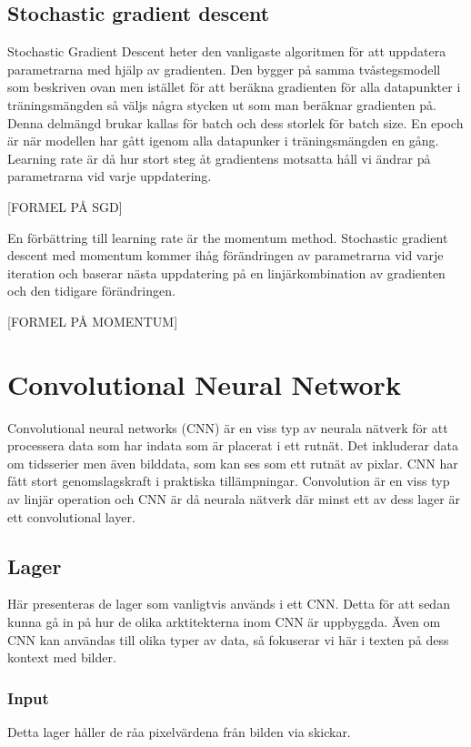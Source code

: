 \documentclass{kththesis}
\begin{document}
  \subsection{Stochastic gradient descent}
  Stochastic Gradient Descent heter den vanligaste algoritmen för att uppdatera parametrarna med hjälp av gradienten. Den bygger på samma tvåstegsmodell som beskriven ovan men istället för att beräkna gradienten för alla datapunkter i träningsmängden så väljs några stycken ut som man beräknar gradienten på. Denna delmängd brukar kallas för batch och dess storlek för batch size. En epoch är när modellen har gått igenom alla datapunker i träningsmängden en gång. Learning rate är då hur stort steg åt gradientens motsatta håll vi ändrar på parametrarna vid varje uppdatering.

  [FORMEL PÅ SGD]

  En förbättring till learning rate är the momentum method. Stochastic gradient descent med momentum kommer ihåg förändringen av parametrarna vid varje iteration och baserar nästa uppdatering på en linjärkombination av gradienten och den tidigare förändringen. 

  [FORMEL PÅ MOMENTUM]

  \section{Convolutional Neural Network}
  Convolutional neural networks (CNN) är en viss typ av neurala nätverk för att processera data som har indata som är placerat i ett rutnät. Det inkluderar data om tidsserier men även bilddata, som kan ses som ett rutnät av pixlar. CNN har fått stort genomslagskraft i praktiska tillämpningar. Convolution är en viss typ av linjär operation och CNN är då neurala nätverk där minst ett av dess lager är ett convolutional layer. 

    \subsection{Lager}
    Här presenteras de lager som vanligtvis används i ett CNN. 
    Detta för att sedan kunna gå in på hur de olika arktitekterna inom CNN är uppbyggda.
    Även om CNN kan användas till olika typer av data, så fokuserar vi här i texten på dess kontext med bilder.

      \subsubsection{Input}
      Detta lager håller de råa pixelvärdena från bilden via skickar. 
\end{document}
